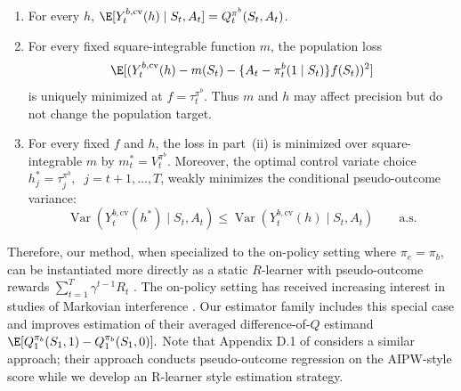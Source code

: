\documentclass[opre,nonblindrev]{informs4}
\newenvironment{revision}{\begingroup\color{revisionblue}\ignorespaces}{\endgroup}
\newcommand{\blipadv}{\tau}
\begin{document}
\begin{revision}
\begin{proposition}
\begin{enumerate}
\item[(i)]
For every \(h\), $\E[
Y_t^{b,\mathrm{cv}}(h)
\mid 
S_t,A_t
]
=
Q_t^{\pi^b}(S_t,A_t)$.


\item[(ii)]
For every fixed square-integrable function \(m\), the population loss
\[
\E[
(
Y_t^{b,\mathrm{cv}}(h)-m(S_t)
-\{A_t-\pi_t^b(1\mid S_t)\}f(S_t)
)^{2}
]
\]
is uniquely minimized at $f=\blipadv_t^{\pi^b}$. Thus \(m\) and \(h\) may affect precision but do not change the
population target.

\item[(iii)]
For every fixed \(f\) and \(h\), the loss in part~\textup{(ii)} is
minimized over square-integrable \(m\) by $m_t^*=V_t^{\pi^b}$.
Moreover, the optimal control variate
choice  $h_j^*=\blipadv_j^{\pi^b},
\;\; j=t+1,\ldots,T$,
weakly minimizes the conditional pseudo-outcome variance:
\[
\operatorname{Var}(
Y_t^{b,\mathrm{cv}}(h^*)
\mid 
S_t,A_t)
\le
\operatorname{Var}
(Y_t^{b,\mathrm{cv}}(h)
\mid 
S_t,A_t)
\qquad\text{a.s.}
\]
\end{enumerate}
\end{proposition}


Therefore, our method, when specialized to the on-policy setting where $\pi_e = \pi_b$, can be instantiated more directly as a static $R$-learner with pseudo-outcome rewards $\sum_{t=1}^T \gamma^{t-1} R_t$ \citep{nie2021quasi}. The on-policy setting has received increasing interest in studies of Markovian interference \citep{farias2022markovian,jia2026experimentation}. Our estimator family includes this special case and improves estimation of their averaged difference-of-$Q$ estimand $\E[Q_1^{\pi_b}(S_1,1)-Q_1^{\pi_b}(S_1,0)].$ Note that Appendix D.1 of \citet{jia2026experimentation} considers a similar approach; their approach conducts pseudo-outcome regression on the AIPW-style score while we develop an R-learner style estimation strategy.

\end{revision}

\end{document}
